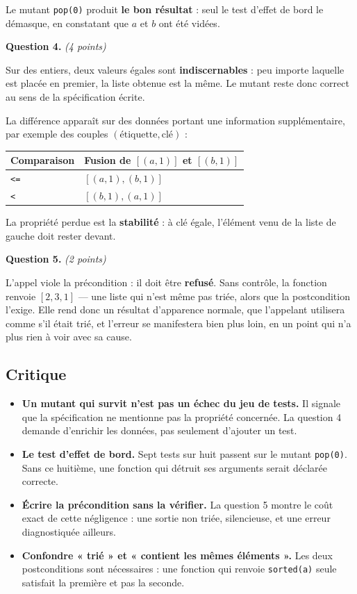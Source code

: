 Le mutant \lstinline{pop(0)} produit \textbf{le bon résultat} : seul le test
d'effet de bord le démasque, en constatant que $a$ et $b$ ont été vidées.

\medskip
\textbf{Question 4.} \emph{(4 points)}

Sur des entiers, deux valeurs égales sont \textbf{indiscernables} : peu importe
laquelle est placée en premier, la liste obtenue est la même. Le mutant reste
donc correct au sens de la spécification écrite.

La différence apparaît sur des données portant une information supplémentaire,
par exemple des couples $(\text{étiquette}, \text{clé})$ :

\begin{center}
\begin{tabular}{|l|l|}
\hline
\textbf{Comparaison} & \textbf{Fusion de $[(a,1)]$ et $[(b,1)]$} \\
\hline
\texttt{<=} & $[(a,1), (b,1)]$ \\
\hline
\texttt{<} & $[(b,1), (a,1)]$ \\
\hline
\end{tabular}
\end{center}

La propriété perdue est la \textbf{stabilité} : à clé égale, l'élément venu de
la liste de gauche doit rester devant.

\medskip
\textbf{Question 5.} \emph{(2 points)}

L'appel viole la précondition : il doit être \textbf{refusé}. Sans contrôle, la
fonction renvoie $[2, 3, 1]$ — une liste qui n'est même pas triée, alors que la
postcondition l'exige. Elle rend donc un résultat d'apparence normale, que
l'appelant utilisera comme s'il était trié, et l'erreur se manifestera bien plus
loin, en un point qui n'a plus rien à voir avec sa cause.

\subsection*{Critique}

\begin{itemize}
  \item \textbf{Un mutant qui survit n'est pas un échec du jeu de tests.} Il
    signale que la spécification ne mentionne pas la propriété concernée. La
    question 4 demande d'enrichir les données, pas seulement d'ajouter un test.
  \item \textbf{Le test d'effet de bord.} Sept tests sur huit passent sur le
    mutant \lstinline{pop(0)}. Sans ce huitième, une fonction qui détruit ses
    arguments serait déclarée correcte.
  \item \textbf{Écrire la précondition sans la vérifier.} La question 5 montre
    le coût exact de cette négligence : une sortie non triée, silencieuse, et
    une erreur diagnostiquée ailleurs.
  \item \textbf{Confondre « trié » et « contient les mêmes éléments ».} Les deux
    postconditions sont nécessaires : une fonction qui renvoie
    \lstinline{sorted(a)} seule satisfait la première et pas la seconde.
\end{itemize}

